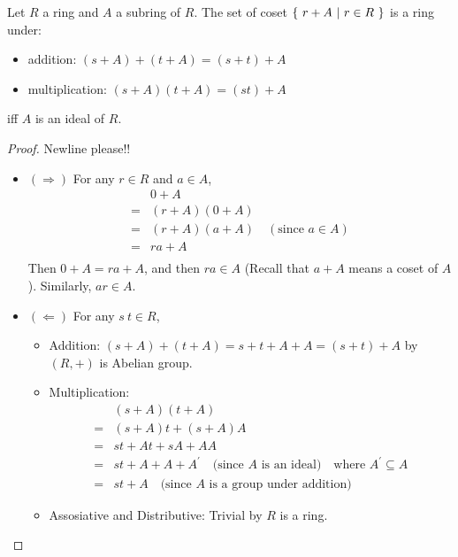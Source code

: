 \documentclass[../main.tex]{subfiles}
\begin{document}
\begin{theorem}
  Let $R$ a ring and $A$ a subring of $R$. The set of coset
  $\{ \ r + A \ | \ r \in R \ \}$ is a ring under:
  \begin{itemize}
    \item addition: $(s + A) + (t + A) = (s + t) + A$
    \item multiplication: $(s + A)(t + A) = (st) + A$
  \end{itemize}
  iff $A$ is an ideal of $R$.
\end{theorem}
\begin{proof}
  Newline please!!
  \begin{itemize}
    \item $(\Rightarrow)$ For any $r \in R$ and $a \in A$,
      \begin{align*}
         & 0 + A \\
        =& (r + A) (0 + A) \\
        =& (r + A) (a + A) \quad (\text{since } a \in A)\\
        =& ra + A \\
      \end{align*}
      Then $0 + A = ra + A$, and then $ra \in A$ (Recall that $a + A$ means a coset of $A$).
      Similarly, $ar \in A$.
    \item $(\Leftarrow)$ For any $s \ t \in R$,
      \begin{itemize}
        \item Addition: $(s + A) + (t + A) = s + t + A + A = (s + t) + A$ by $(R, +)$ is Abelian group.
        \item Multiplication:
          \begin{align*}
             & (s + A) (t + A) \\
            =& (s + A)t + (s + A)A \\
            =& st + At + sA + AA \\ 
            =& st + A + A + A^\prime \quad \text{(since $A$ is an ideal)} \quad \text{where $A^\prime \subseteq A$} \\
            =& st + A \quad \text{(since $A$ is a group under addition)}
          \end{align*}
        \item Assosiative and Distributive: Trivial by $R$ is a ring.
      \end{itemize}
  \end{itemize}
\end{proof}
\end{document}
